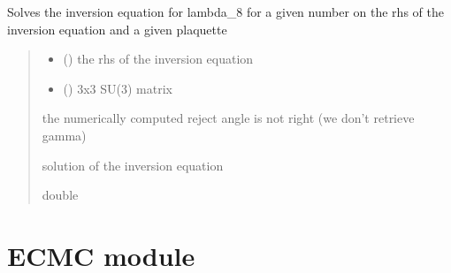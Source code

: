 \documentclass[letterpaper,10pt,english]{sphinxmanual}
\begin{document}

\begin{fulllineitems}
\label{\detokenize{numerical_reject:numerical_reject.solve_8}}
\pysigstartsignatures
\pysiglinewithargsret
{}
{\sphinxparamcomma {}}
{}
\pysigstopsignatures
\sphinxAtStartPar
Solves the inversion equation for lambda\_8 for a given number on the rhs of the inversion equation and a given plaquette
\begin{quote}\begin{description}
\begin{itemize}
\item {} 
\sphinxAtStartPar
{} () \textendash{} the rhs of the inversion equation

\item {} 
\sphinxAtStartPar
{} () \textendash{} 3x3 SU(3) matrix

\end{itemize}

\sphinxAtStartPar
{} \textendash{} the numerically computed reject angle is not right (we don’t retrieve gamma)

\sphinxAtStartPar
solution of the inversion equation

\sphinxAtStartPar
double

\end{description}\end{quote}

\end{fulllineitems}


\sphinxstepscope


\section{ECMC module}
\label{\detokenize{ECMC:module-ECMC}}\label{\detokenize{ECMC:ecmc-module}}\label{\detokenize{ECMC::doc}}
\end{document}

